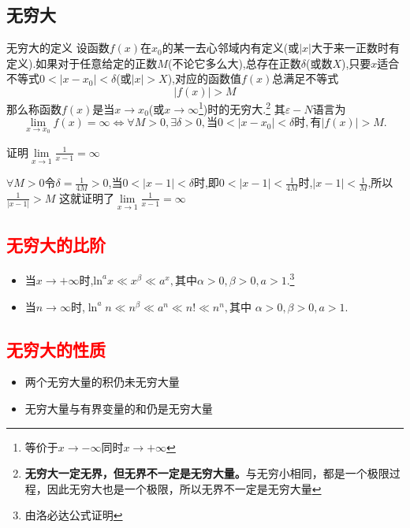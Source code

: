 \documentclass[12pt, a4paper, oneside, UTF8]{ctexbook}
\begin{document}
\begin{sloppypar}
    \subsection{无穷大}
    \begin{defn}{无穷大的定义}{}
        设函数$f(x)$在$x_0$的某一去心邻域内有定义(或$|x|$大于来一正数时有定义).如果对于任意给定的正数$M$(不论它多么大),总存在正数$\delta$(或数$X$),只要$x$适合不等式$0<|x-x_0|<\delta$(或$|x|>X$),对应的函数值$f(x)$总满足不等式
        $$
            |f(x)|>M
        $$
        那么称函数$f(x)$是当$x\to x_0$(或$x\to\infty$\footnote{等价于$x \to -\infty$同时$x \to +\infty$})时的无穷大.\footnote{\textbf{无穷大一定无界，但无界不一定是无穷大量。}与无穷小相同，都是一个极限过程，因此无穷大也是一个极限，所以无界不一定是无穷大量}
        其$\varepsilon-N$语言为
        $$
            \lim\limits_{x\to x_0}f(x)= \infty \Leftrightarrow\forall M >0,\exists\delta>0,\text{当}0<|x-x_0|<\delta\text{时},\text{有}|f(x)|>M.
        $$
    \end{defn}
    \begin{problem}
    证明$\underset{x\rightarrow1}{\operatorname*{lim}}\frac{1}{x-1}=\infty $
    \end{problem}
    \begin{solution}
        $\forall M>0$令$\delta=\frac{1}{4M}>0$,当$0<|x-1|<\delta$时,即$0<|x-1|<\frac{1}{4M}$时,$|x-1|<\frac{1}{M}$,所以$\frac{1}{|x-1|}>M$
        这就证明了$\underset{x\rightarrow1}{\operatorname*{lim}}\frac{1}{x-1}=\infty$
    \end{solution}
    \subsection{\textcolor{red}{无穷大的比阶}}
    \begin{itemize}
        \item 当$x \to +\infty$时,$\mathrm{ln}^ax\ll x^\beta\ll a^x,\text{其中}\alpha>0,\beta>0,a>1.$\footnote{由洛必达公式证明}
        \item 当$n \to \infty$时,$\ln^an\ll n^\beta\ll a^n\ll n!\ll n^n,\text{其中 }\alpha>0,\beta>0,a>1.$
    \end{itemize}
    \subsection{\textcolor{red}{无穷大的性质}}
    \begin{itemize}
        \item 两个无穷大量的积仍未无穷大量
        \item 无穷大量与有界变量的和仍是无穷大量
    \end{itemize}

\end{sloppypar}
\end{document}
